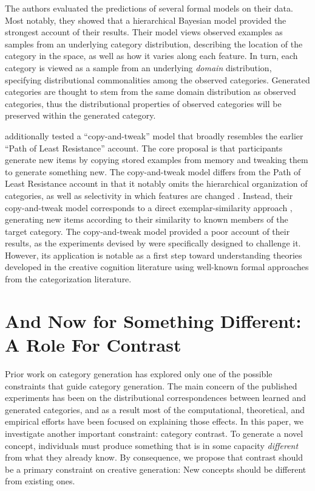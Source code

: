 \documentclass[12pt]{article}
\begin{document}
\begin{flushleft}
The authors evaluated the predictions of several formal models on their data. Most notably, they showed that a hierarchical Bayesian model provided the strongest account of their results. Their model views observed examples as samples from an underlying category distribution, describing the location of the category in the space, as well as how it varies along each feature. In turn, each category is viewed as a sample from an underlying {\em domain} distribution, specifying distributional commonalities among the observed categories. Generated categories are thought to stem from the same domain distribution as observed categories, thus the distributional properties of observed categories will be preserved within the generated category.

\cite{jern2013probabilistic} additionally tested a ``copy-and-tweak'' model that broadly resembles the earlier ``Path of Least Resistance'' account. The core proposal is that participants generate new items by copying stored examples from memory and tweaking them to generate something new. The copy-and-tweak model differs from the Path of Least Resistance account in that it notably omits the hierarchical organization of categories, as well as selectivity in which features are changed \citep[both of which are factors in the Path of Least Resistance account;][]{ward2002role}. Instead, their copy-and-tweak model corresponds to a direct exemplar-similarity approach \citep[e.g.,][]{nosofsky1984choice,nosofsky1986attention}, generating new items according to their similarity to known members of the target category. The copy-and-tweak model provided a poor account of their results, as the experiments devised by \citeauthor{jern2013probabilistic} were specifically designed to challenge it. However, its application is notable as a first step toward understanding theories developed in the creative cognition literature using well-known formal approaches from the categorization literature.


\section{And Now for Something Different: A Role For Contrast}

Prior work on category generation has explored only one of the possible constraints that guide category generation. The main concern of the published experiments has been on the distributional correspondences between learned and generated categories, and as a result most of the computational, theoretical, and empirical efforts have been focused on explaining those effects. In this paper, we investigate another important constraint: category contrast. To generate a novel concept, individuals must produce something that is in some capacity {\em different} from what they already know. By consequence, we propose that contrast should be a primary constraint on creative generation: New concepts should be different from existing ones. 


\end{flushleft}
\end{document}
